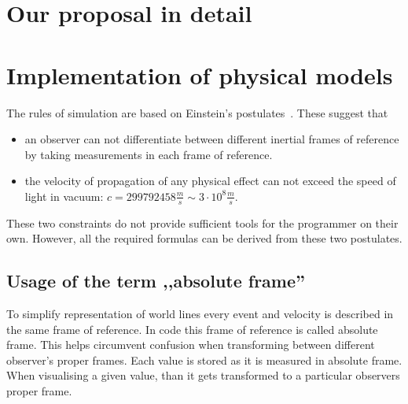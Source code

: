 \documentclass{egpubl}
\begin{document}
\section{Our proposal in detail}

%
%

\section{Implementation of physical models}
The rules of simulation are based on Einstein's postulates~\cite{EinsteinElectrodynamics}. These suggest that
\begin{itemize}
\item an observer can not differentiate between different inertial frames of reference by taking measurements in each frame of reference.
\item the velocity of propagation of any physical effect can not exceed
the speed of light in vacuum: $c=299792458 \frac{m}{s} \sim 3 \cdot 10^8 \frac{m}{s}$.
 \end{itemize}
These two constraints do not provide sufficient tools for the programmer on their own. However, all the required formulas can be derived from these two postulates.

\subsection{Usage of the term ,,absolute frame''}
To simplify representation of world lines every event and velocity is described in the same frame of reference. In code this frame of reference is called absolute frame. This helps circumvent confusion when transforming between different observer's proper frames. Each value is stored as it is measured in absolute frame. When visualising a given value, than it gets transformed to a particular observers proper frame.
\end{document}
